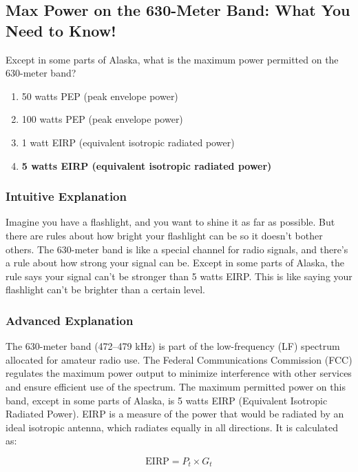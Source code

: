 \subsection{Max Power on the 630-Meter Band: What You Need to Know!}

\begin{tcolorbox}[colback=gray!10!white,colframe=black!75!black,title=E1A09] Except in some parts of Alaska, what is the maximum power permitted on the 630-meter band?
    \begin{enumerate}[label=\Alph*]
        \item 50 watts PEP (peak envelope power)
        \item 100 watts PEP (peak envelope power)
        \item 1 watt EIRP (equivalent isotropic radiated power)
        \item \textbf{5 watts EIRP (equivalent isotropic radiated power)}
    \end{enumerate}
\end{tcolorbox}

\subsubsection{Intuitive Explanation}
Imagine you have a flashlight, and you want to shine it as far as possible. But there are rules about how bright your flashlight can be so it doesn’t bother others. The 630-meter band is like a special channel for radio signals, and there’s a rule about how strong your signal can be. Except in some parts of Alaska, the rule says your signal can’t be stronger than 5 watts EIRP. This is like saying your flashlight can’t be brighter than a certain level.

\subsubsection{Advanced Explanation}
The 630-meter band (472–479 kHz) is part of the low-frequency (LF) spectrum allocated for amateur radio use. The Federal Communications Commission (FCC) regulates the maximum power output to minimize interference with other services and ensure efficient use of the spectrum. The maximum permitted power on this band, except in some parts of Alaska, is 5 watts EIRP (Equivalent Isotropic Radiated Power). EIRP is a measure of the power that would be radiated by an ideal isotropic antenna, which radiates equally in all directions. It is calculated as:

\[
\text{EIRP} = P_t \times G_t
\]

